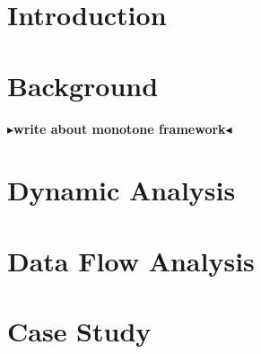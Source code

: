 \documentclass[twoside,11pt,openright]{report}
\theoremstyle{definition}
\newcommand{\todo}[1]{{\color[rgb]{.5,0,0}\textbf{$\blacktriangleright$#1$\blacktriangleleft$}}}
\begin{document}
\chapter{Introduction}
\label{ch:intro}


\chapter{Background}
\label{ch:background}


\todo{write about monotone framework}

\chapter{Dynamic Analysis}
\label{ch:study}







\chapter{Data Flow Analysis}
\label{ch:analysis}
%











\chapter{Case Study}
\label{ch:evaluation}








\end{document}
